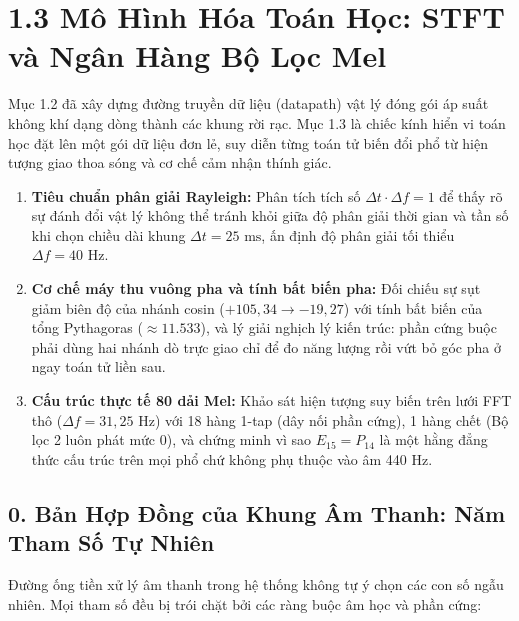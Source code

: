 \documentclass[11pt,a4paper]{article}
\begin{document}
\section*{1.3 Mô Hình Hóa Toán Học: STFT và Ngân Hàng Bộ Lọc Mel}

Mục 1.2 đã xây dựng đường truyền dữ liệu (datapath) vật lý đóng gói áp suất không khí dạng dòng thành các khung rời rạc. Mục 1.3 là chiếc kính hiển vi toán học đặt lên một gói dữ liệu đơn lẻ, suy diễn từng toán tử biến đổi phổ từ hiện tượng giao thoa sóng và cơ chế cảm nhận thính giác.

\begin{learningobj}
\begin{enumerate}
    \item \textbf{Tiêu chuẩn phân giải Rayleigh:} Phân tích tích số $\Delta t \cdot \Delta f = 1$ để thấy rõ sự đánh đổi vật lý không thể tránh khỏi giữa độ phân giải thời gian và tần số khi chọn chiều dài khung $\Delta t = 25\text{ ms}$, ấn định độ phân giải tối thiểu $\Delta f = 40\text{ Hz}$.
    \item \textbf{Cơ chế máy thu vuông pha và tính bất biến pha:} Đối chiếu sự sụt giảm biên độ của nhánh cosin ($+105{,}34 \to -19{,}27$) với tính bất biến của tổng Pythagoras ($\approx 11.533$), và lý giải nghịch lý kiến trúc: phần cứng buộc phải dùng hai nhánh dò trực giao chỉ để đo năng lượng rồi vứt bỏ góc pha ở ngay toán tử liền sau.
    \item \textbf{Cấu trúc thực tế 80 dải Mel:} Khảo sát hiện tượng suy biến trên lưới FFT thô ($\Delta f = 31{,}25\text{ Hz}$) với 18 hàng 1-tap (dây nối phần cứng), 1 hàng chết (Bộ lọc 2 luôn phát mức 0), và chứng minh vì sao $E_{15} = P_{14}$ là một hằng đẳng thức cấu trúc trên mọi phổ chứ không phụ thuộc vào âm 440 Hz.
\end{enumerate}
\end{learningobj}

\subsection*{0. Bản Hợp Đồng của Khung Âm Thanh: Năm Tham Số Tự Nhiên}

Đường ống tiền xử lý âm thanh trong hệ thống không tự ý chọn các con số ngẫu nhiên. Mọi tham số đều bị trói chặt bởi các ràng buộc âm học và phần cứng:
\end{document}
